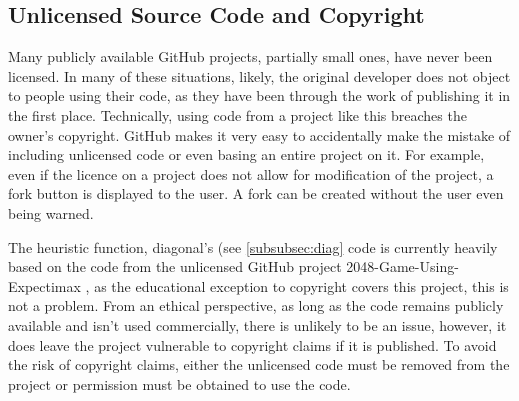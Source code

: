 \documentclass{article}
\begin{document}
\subsection{Unlicensed Source Code and Copyright}
Many publicly available GitHub projects, partially small ones, have never been licensed. In many of these situations, likely, the original developer does not object to people using their code, as they have been through the work of publishing it in the first place. Technically, using code from a project like this breaches the owner's copyright. GitHub makes it very easy to accidentally make the mistake of including unlicensed code or even basing an entire project on it. For example, even if the licence on a project does not allow for modification of the project, a fork button is displayed to the user. A fork can be created without the user even being warned.

The heuristic function, diagonal's (see \ref{subsubsec:diag} code is currently heavily based on the code from the unlicensed GitHub project 2048-Game-Using-Expectimax \cite{expectimax2048}, as the educational exception to copyright covers this project, this is not a problem. From an ethical perspective, as long as the code remains publicly available and isn't used commercially, there is unlikely to be an issue, however, it does leave the project vulnerable to copyright claims if it is published. To avoid the risk of copyright claims, either the unlicensed code must be removed from the project or permission must be obtained to use the code.



\end{document}
